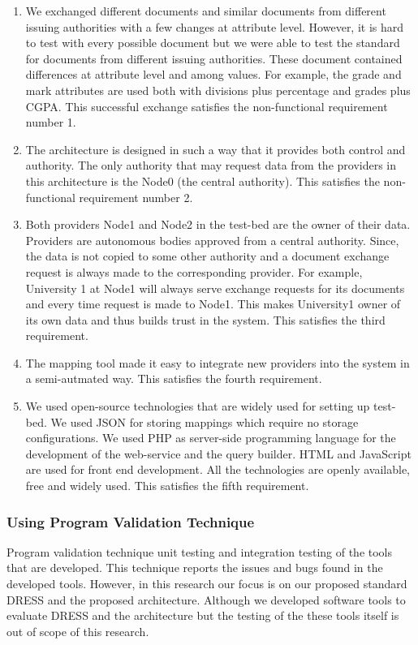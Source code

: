 \documentclass[12pt,a4paper,oneside]{book}
\begin{document}
	\begin{enumerate}  

		\item We exchanged different documents and similar documents from different issuing authorities with a few changes at attribute level. However, it is hard to test with every possible document but we were able to test the standard for documents from different issuing authorities. These document contained differences at attribute level and among values. For example, the grade and mark attributes are used both with divisions plus percentage and grades plus CGPA. This successful exchange satisfies the non-functional requirement number 1.

		\item The architecture is designed in such a way that it provides both control and authority. The only authority that may request data from the providers in this architecture is the Node0 (the central authority). This satisfies the non-functional requirement number 2. 
	
		\item Both providers Node1 and Node2 in the test-bed are the owner of their data. Providers are autonomous bodies approved from a central authority. Since, the data is not copied to some other authority and a document exchange request is always made to the corresponding provider. For example, University 1 at Node1 will always serve exchange requests for its documents and every time request is made to Node1. This makes University1 owner of its own data and thus builds trust in the system. This satisfies the third requirement.
		
		\item The mapping tool made it easy to integrate new providers into the system in a semi-autmated way. This satisfies the fourth requirement. 
		
		\item We used open-source technologies that are widely used for setting up test-bed. We used JSON for storing mappings which require no storage configurations. We used PHP as server-side programming language for the development of the web-service and the query builder. HTML and JavaScript are used for front end development. All the technologies are openly available, free and widely used. This satisfies the fifth requirement.

	\end{enumerate}
		
		
		\subsubsection{Using Program Validation Technique}
		Program validation technique unit testing and integration testing of the tools that are developed. This technique reports the issues and bugs found in the developed tools. However, in this research our focus is on our proposed standard DRESS and the proposed architecture. Although we developed software tools to evaluate DRESS and the architecture but the testing of the these tools itself is out of scope of this research. 
	
\end{document}
